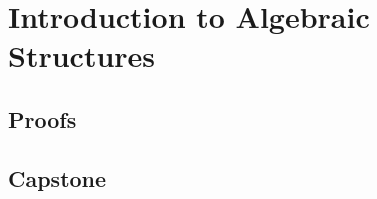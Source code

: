 %

\chapter{Introduction to Algebraic Structures}
\label{chap:algebraic-structures-legacy}



\clearpage
\section*{Proofs}


\section*{Capstone}

